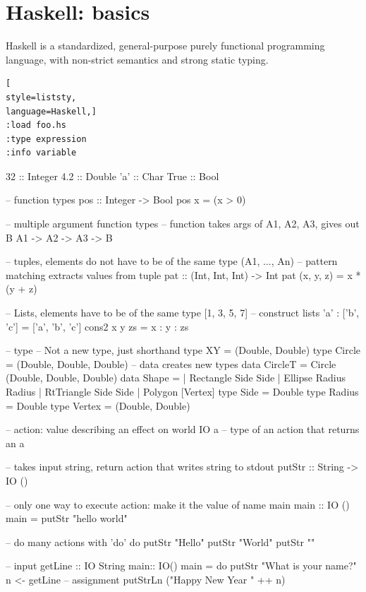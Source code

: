 \section{Haskell: basics}
Haskell is a standardized, general-purpose purely functional programming language, with non-strict semantics and strong static typing.

\begin{lstlisting}[
style=liststy,
language=Haskell,]
:load foo.hs
:type expression
:info variable
\end{lstlisting}

\begin{haskellcode}
32   :: Integer
4.2  :: Double
'a'  :: Char
True :: Bool

-- function types
pos :: Integer -> Bool
pos x = (x > 0)

-- multiple argument function types
-- function takes args of A1, A2, A3, gives out B
A1 -> A2 -> A3 -> B

-- tuples, elements do not have to be of the same type
(A1, ..., An)
-- pattern matching extracts values from tuple
pat :: (Int, Int, Int) -> Int
pat (x, y, z) = x * (y + z)

-- Lists, elements have to be of the same type
[1, 3, 5, 7]
-- construct lists
'a' : ['b', 'c'] = ['a', 'b', 'c']
cons2 x y zs = x : y : zs

-- type
-- Not a new type, just shorthand
type XY = (Double, Double)
type Circle = (Double, Double, Double)
-- data creates new types
data CircleT = Circle (Double, Double, Double)
data Shape =
    | Rectangle Side Side
    | Ellipse Radius Radius
    | RtTriangle Side Side
    | Polygon [Vertex]
type Side = Double
type Radius = Double
type Vertex = (Double, Double)
\end{haskellcode}



\begin{haskellcode}
-- action: value describing an effect on world
IO a -- type of an action that returns an a

-- takes input string, return action that writes string to stdout
putStr :: String -> IO () 

-- only one way to execute action: make it the value of name main
main :: IO ()
main = putStr "hello world\n"

-- do many actions with 'do'
do putStr "Hello"
   putStr "World"
   putStr "\n"
   
-- input
getLine :: IO String
main:: IO()
main = do putStr "What is your name?"
       n <- getLine -- assignment
       putStrLn ("Happy New Year " ++ n)
\end{haskellcode}



